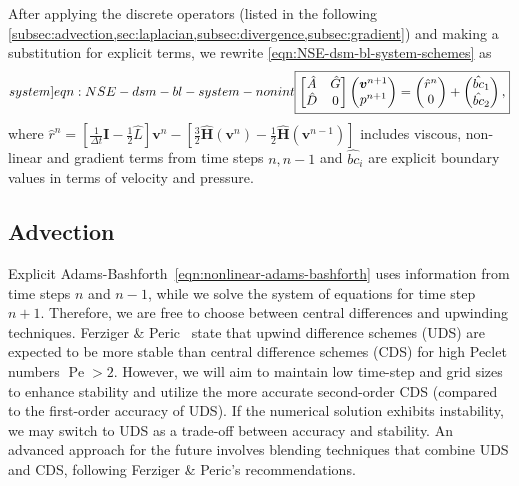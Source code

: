 \documentclass{article}
\numberwithin{equation}{section}
\begin{document}
After applying the discrete operators (listed in the following \cref{subsec:advection,sec:laplacian,subsec:divergence,subsec:gradient}) and making a substitution for explicit terms, we rewrite \cref{eqn:NSE-dsm-bl-system-schemes}  as
\begin{equation}\label[system]{eqn:NSE-dsm-bl-system-nonint}
	\boxed{\begin{bmatrix}
		\hat{A} & \hat{G} \\
		\hat{D} & 0
	\end{bmatrix}
	\begin{pmatrix}
		\boldsymbol{v}^{n+1} \\ 
		p^{n+1}
	\end{pmatrix}
	=
	\begin{pmatrix}
		\hat{r}^n \\
		0
	\end{pmatrix}
	+
	\begin{pmatrix}
		\hat{bc}_1\\
		\hat{bc}_2
	\end{pmatrix},}
\end{equation}
where $\hat{r}^n=\left[\frac{1}{\Delta t}\mathbf{I}-\frac{1}{2}\hat{L}\right] \boldsymbol{v}^n - \left[\frac{3}{2}\hat{\mathbf{H}}(\boldsymbol{v}^n) - \frac{1}{2}\hat{\mathbf{H}}(\boldsymbol{v}^{n-1})\right]$ includes viscous, non-linear and gradient terms from time steps $n,n-1$ and $\hat{bc}_i$ are explicit boundary values in terms of velocity and pressure.




\subsection{Advection}\label{subsec:advection}

Explicit Adams-Bashforth~\cref{eqn:nonlinear-adams-bashforth} uses information from time steps $n$ and $n-1$, while we solve the system of equations for time step $n+1$. Therefore, we are free to choose between central differences and upwinding techniques. 
Ferziger \& Peric~\cite{Ferziger:2002} state that upwind difference schemes (UDS) are expected to be more stable than central difference schemes (CDS) for high Peclet numbers $\operatorname{Pe}>2$. However, we will aim to maintain low time-step and grid sizes to enhance stability and utilize the more accurate second-order CDS (compared to the first-order accuracy of UDS). If the numerical solution exhibits instability, we may switch to UDS as a trade-off between accuracy and stability. An advanced approach for the future involves blending techniques that combine UDS and CDS, following Ferziger \& Peric’s recommendations.
\end{document}
